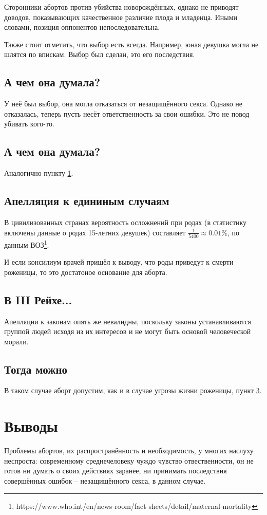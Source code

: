 \documentclass[a4paper,12pt]{report}
\begin{document}
        Сторонники абортов против убийства новорождённых, однако не приводят
        доводов, показывающих качественное различие плода и младенца. Иными словами,
        позиция оппонентов непоследовательна.

        Также стоит отметить, что выбор есть всегда. Например, юная девушка 
        могла не шлятся по впискам. Выбор был сделан, это его последствия.
    \section{А чем она думала?}\label{thing-about-it}
        У неё был выбор, она могла отказаться от незащищённого секса. Однако не отказалась, 
        теперь пусть несёт ответственность за свои ошибки. Это не повод убивать кого-то.
	\section{А чем она думала?}
        Аналогично пункту \ref{thing-about-it}.
    \section{Апелляция к едининым случаям}\label{ifdie}
        В цивилизованных странах вероятность осложнений при родах
        (в статистику включены данные о родах 15-летних девушек)
        составляет $ \frac{1}{5400} \approx 0.01\% $, по данным ВОЗ\footnote{https://www.who.int/en/news-room/fact-sheets/detail/maternal-mortality}.

        И если консилиум врачей пришёл к выводу, что роды приведут к 
        смерти роженицы, то это достатоное основание для аборта.
    \section{В III Рейхе...}\label{laws}
        Апелляции к законам опять же невалидны, поскольку законы устанавливаются группой 
        людей исходя из их интересов и не могут быть основой человеческой морали. 
	\section{Тогда можно}
        В таком случае аборт допустим, как и в случае угрозы жизни роженицы, пункт \ref{ifdie}.


\chapter{Выводы}
Проблемы абортов, их распространённость и необходимость, у многих наслуху неспроста: 
современному среднечеловеку чуждо чувство отвественности, он не готов ни думать о 
своих действиях заранее, ни принимать последствия совершённых ошибок -- незащищённого 
секса, в данном случае.
\end{document}
